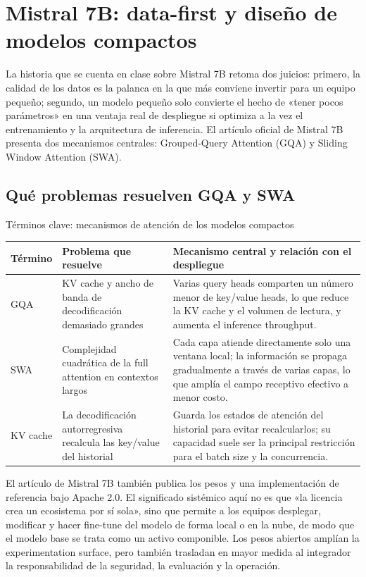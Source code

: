 \section{Mistral 7B: data-first y diseño de modelos compactos}

La historia que se cuenta en clase sobre Mistral 7B retoma dos juicios: primero, la calidad de los datos es la palanca en la que más conviene invertir para un equipo pequeño; segundo, un modelo pequeño solo convierte el hecho de «tener pocos parámetros» en una ventaja real de despliegue si optimiza a la vez el entrenamiento y la arquitectura de inferencia. El artículo oficial de Mistral 7B presenta dos mecanismos centrales: Grouped-Query Attention (GQA) y Sliding Window Attention (SWA).

\subsection{Qué problemas resuelven GQA y SWA}

\begin{knowledgebox}{Términos clave: mecanismos de atención de los modelos compactos}
\begin{tabularx}{\textwidth}{L{0.18\textwidth}>{\raggedright\arraybackslash}X>{\raggedright\arraybackslash}X}
\toprule
Término & Problema que resuelve & Mecanismo central y relación con el despliegue \\
\midrule
GQA & KV cache y ancho de banda de decodificación demasiado grandes & Varias query heads comparten un número menor de key/value heads, lo que reduce la KV cache y el volumen de lectura, y aumenta el inference throughput. \\
SWA & Complejidad cuadrática de la full attention en contextos largos & Cada capa atiende directamente solo una ventana local; la información se propaga gradualmente a través de varias capas, lo que amplía el campo receptivo efectivo a menor costo. \\
KV cache & La decodificación autorregresiva recalcula las key/value del historial & Guarda los estados de atención del historial para evitar recalcularlos; su capacidad suele ser la principal restricción para el batch size y la concurrencia. \\
\bottomrule
\end{tabularx}
\end{knowledgebox}

El artículo de Mistral 7B también publica los pesos y una implementación de referencia bajo Apache 2.0. El significado sistémico aquí no es que «la licencia crea un ecosistema por sí sola», sino que permite a los equipos desplegar, modificar y hacer fine-tune del modelo de forma local o en la nube, de modo que el modelo base se trata como un activo componible. Los pesos abiertos amplían la experimentation surface, pero también trasladan en mayor medida al integrador la responsabilidad de la seguridad, la evaluación y la operación.


